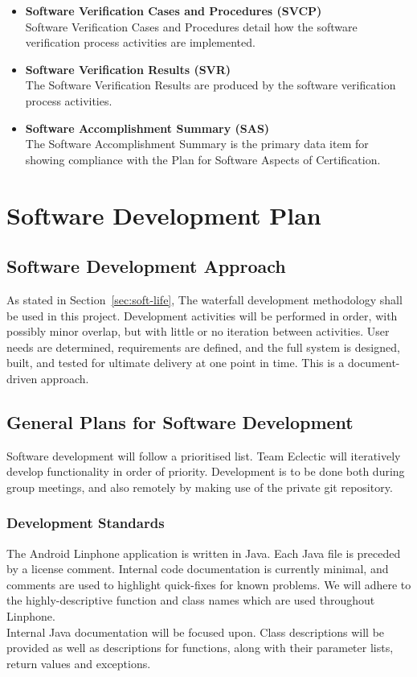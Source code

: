 \documentclass[11pt]{article}
\begin{document}
\begin{itemize}
\item \textbf{Software Verification Cases and Procedures (SVCP)} \\
Software Verification Cases and Procedures detail how the software verification process activities are implemented.
\item \textbf{Software Verification Results (SVR)} \\
The Software Verification Results are produced by the software verification process activities.
\item \textbf{Software Accomplishment Summary (SAS)} \\
The Software Accomplishment Summary is the primary data item for showing compliance with the Plan for Software Aspects of Certification.
\end{itemize}

\section{Software Development Plan}
\subsection{Software Development Approach}
As stated in Section~\ref{sec:soft-life}, The waterfall development methodology shall be used in this project.
Development activities will be performed in order, with possibly minor overlap, but with little or no iteration between activities. User needs are determined, requirements are defined, and the full system is designed, built, and tested for ultimate delivery at one point in time. This is a document-driven approach.

\subsection{General Plans for Software Development}
Software development will follow a prioritised list. Team Eclectic will iteratively develop functionality in order of priority. Development is to be done both during group meetings, and also remotely by making use of the private git repository.
\subsubsection{Development Standards}
The Android Linphone application is written in Java. Each Java file is preceded by a license comment. Internal code documentation is currently minimal, and comments are used to highlight quick-fixes for known problems. We will adhere to the highly-descriptive function and class names which are used throughout Linphone. \\
Internal Java documentation will be focused upon. Class descriptions will be provided as well as descriptions for functions, along with their parameter lists, return values and exceptions.
\end{document}
